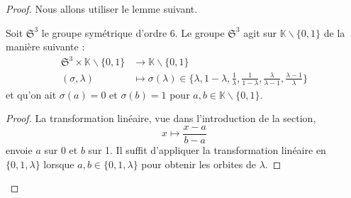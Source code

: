 \documentclass[a4paper]{article}
\begin{document}
\begin{proof}
Nous allons utiliser le lemme suivant.
\begin{lem} \label{bi}
Soit $\mathfrak{S}^3$ le groupe symétrique d'ordre 6. Le groupe $\mathfrak{S}^3$ agit sur $\mathbb{K}\backslash \{0,1\}$ de la manière suivante :
\begin{align*}
\mathfrak{S}^3 \times \mathbb{K}\backslash \{0,1\} &\rightarrow \mathbb{K}\backslash \{0,1\} \\
(\sigma,\lambda) &\mapsto \sigma(\lambda) \in \{\lambda, 1-\lambda, \frac{1}{\lambda}, \frac{1}{1-\lambda},\frac{\lambda}{\lambda-1}, \frac{\lambda-1}{\lambda}\}
\end{align*}
et qu'on ait $\sigma(a)=0$ et $\sigma(b)=1$ pour $a,b \in \mathbb{K}\backslash \{0,1\}$.
\end{lem}

\begin{proof}
La transformation linéaire, vue dans l'introduction de la section,
\begin{equation*}
x \mapsto \frac{x-a}{b-a}
\end{equation*}
envoie $a$ sur 0 et $b$ sur 1.
Il suffit d'appliquer la transformation linéaire  en $\{0,1,\lambda\}$ lorsque $a,b \in \{0,1,\lambda\}$ pour obtenir les orbites de $\lambda$.
\end{proof}





\end{proof}
\end{document}
